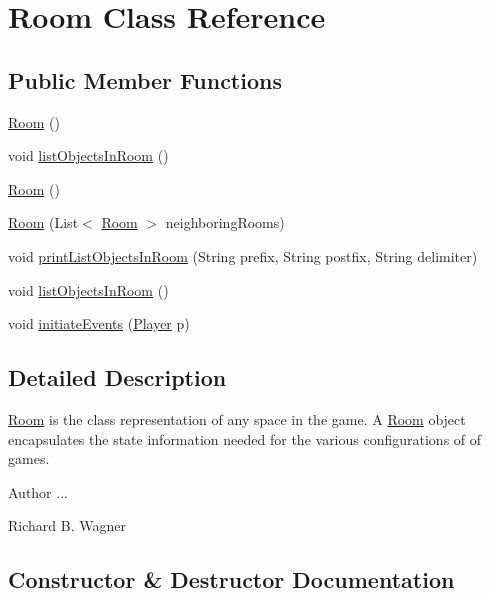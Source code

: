 \hypertarget{class_room}{}\section{Room Class Reference}
\label{class_room}
\subsection*{Public Member Functions}
\begin{DoxyCompactItemize}
\item 
\hyperlink{class_room_aca38f1673fd9264e15575e6faa34ba44}{Room} ()
\item 
void \hyperlink{class_room_a5736252d41ba0dd28448a8a503ffac6b}{list\+Objects\+In\+Room} ()
\item 
\hyperlink{class_room_aca38f1673fd9264e15575e6faa34ba44}{Room} ()
\item 
\hyperlink{class_room_a7f6ed8f23c70b90599acdd68ca7aed06}{Room} (List$<$ \hyperlink{class_room}{Room} $>$ neighboring\+Rooms)
\item 
void \hyperlink{class_room_a4f262a8900dd0bed2891f3c21e1baa0f}{print\+List\+Objects\+In\+Room} (String prefix, String postfix, String delimiter)
\item 
void \hyperlink{class_room_a5736252d41ba0dd28448a8a503ffac6b}{list\+Objects\+In\+Room} ()
\item 
void \hyperlink{class_room_af0380bf1a3f1ef06242b8db7dee85567}{initiate\+Events} (\hyperlink{class_player}{Player} p)
\end{DoxyCompactItemize}


\subsection{Detailed Description}
\hyperlink{class_room}{Room} is the class representation of any space in the game. A \hyperlink{class_room}{Room} object encapsulates the state information needed for the various configurations of of games.

\begin{DoxyAuthor}{Author}
... 

Richard B. Wagner 
\end{DoxyAuthor}


\subsection{Constructor \& Destructor Documentation}
\hypertarget{class_room_aca38f1673fd9264e15575e6faa34ba44}{}
